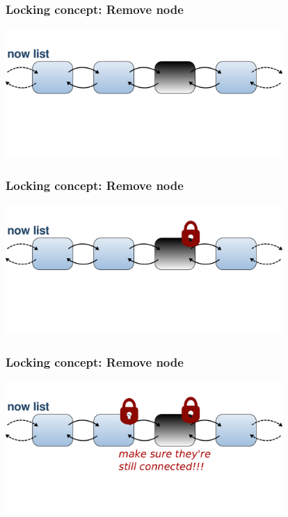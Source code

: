 \documentclass{beamer}
\begin{document}

\begin{frame}
\frametitle{Locking concept: Remove node}
\begin{center}
	\includegraphics[height=140pt]{remove1.pdf}
\end{center}
\end{frame}

\begin{frame}
\frametitle{Locking concept: Remove node}
\begin{center}
	\includegraphics[height=140pt]{remove2.pdf}
\end{center}
\end{frame}

\begin{frame}
\frametitle{Locking concept: Remove node}
\begin{center}
	\includegraphics[height=140pt]{remove3.pdf}
\end{center}
\end{frame}
\end{document}
